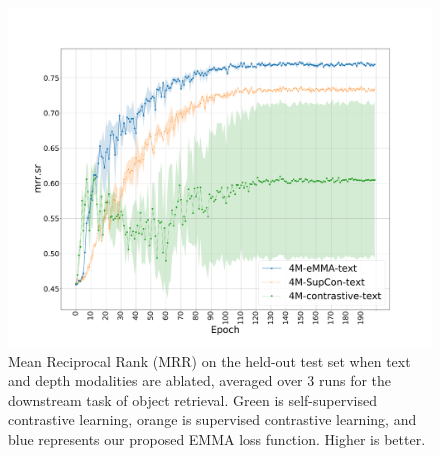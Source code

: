 \documentclass[sigconf,natbib=true,anonymous=true]{acmart}
\newcommand{\todocmi}[1]{\todo[inline,color=green!40]{\small #1 -- Cynthia}}
\newcommand{\Complete}[0]{{\textbf {\color{red}Complete it }}}
\begin{document}
\begin{figure}[tbh]
\centering
\includegraphics[width=.99\columnwidth]{Figures/average-seeds-epochs-mrr_ar.pdf}
\caption{Mean Reciprocal Rank (MRR) on the held-out test set when text and depth modalities are ablated, averaged over 3 runs for the downstream task of object retrieval.  Green is self-supervised contrastive learning, orange is supervised contrastive learning, and blue represents our proposed EMMA loss function. Higher is better.
}
\label{fig:epochs-mrr.sr}
\end{figure}
\end{document}
